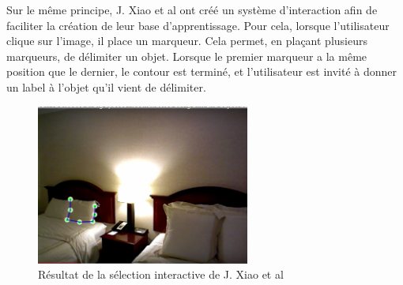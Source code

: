 Sur le même principe, J. Xiao et al\cite{interactionSeg2}
ont créé un système d'interaction afin de faciliter la création de leur base d'apprentissage. Pour cela, lorsque l'utilisateur 
clique sur l'image, il place un marqueur. Cela permet, en plaçant plusieurs marqueurs, de délimiter un objet. Lorsque le premier
marqueur a la même position que le dernier, le contour est terminé, et l'utilisateur est invité à donner un label à l'objet
qu'il vient de délimiter.

\begin{figure}[!ht]
  \begin{center}
    \includegraphics[width=7cm]{image/segInteractive1.png}
    \caption{Résultat de la sélection interactive de J. Xiao et al\cite{interactionSeg2}}
  \end{center}
\end{figure}
